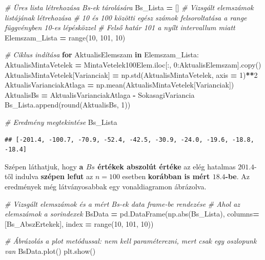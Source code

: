 \documentclass[
]{book}
\newenvironment{Shaded}{\begin{snugshade}}{\end{snugshade}}
\newcommand{\BuiltInTok}[1]{#1}
\newcommand{\CommentTok}[1]{\textcolor[rgb]{0.56,0.35,0.01}{\textit{#1}}}
\newcommand{\ControlFlowTok}[1]{\textcolor[rgb]{0.13,0.29,0.53}{\textbf{#1}}}
\newcommand{\DecValTok}[1]{\textcolor[rgb]{0.00,0.00,0.81}{#1}}
\newcommand{\KeywordTok}[1]{\textcolor[rgb]{0.13,0.29,0.53}{\textbf{#1}}}
\newcommand{\NormalTok}[1]{#1}
\newcommand{\OperatorTok}[1]{\textcolor[rgb]{0.81,0.36,0.00}{\textbf{#1}}}
\newcommand{\StringTok}[1]{\textcolor[rgb]{0.31,0.60,0.02}{#1}}
\begin{document}
\begin{Shaded}
\begin{Highlighting}[]
\CommentTok{\# Üres lista létrehozása Bs{-}ek tárolására}
\NormalTok{Bs\_Lista }\OperatorTok{=}\NormalTok{ []}
\CommentTok{\# Vizsgált elemszámok listájának létrehozása}
\CommentTok{\# 10 és 100 közötti egész számok felsoroltatása a \textquotesingle{}range\textquotesingle{} függvényben 10{-}es lépésközzel}
\CommentTok{\# Felső határ 101 a nyílt intervallum miatt}
\NormalTok{Elemszam\_Lista }\OperatorTok{=} \BuiltInTok{range}\NormalTok{(}\DecValTok{10}\NormalTok{, }\DecValTok{101}\NormalTok{, }\DecValTok{10}\NormalTok{)}

\CommentTok{\# Ciklus indítása}
\ControlFlowTok{for}\NormalTok{ AktualisElemszam }\KeywordTok{in}\NormalTok{ Elemszam\_Lista:}
\NormalTok{  AktualisMintaVetelek }\OperatorTok{=}\NormalTok{ MintaVetelek100Elem.iloc[:, }\DecValTok{0}\NormalTok{:AktualisElemszam].copy()}
\NormalTok{  AktualisMintaVetelek[}\StringTok{\textquotesingle{}Varianciak\textquotesingle{}}\NormalTok{] }\OperatorTok{=}\NormalTok{ np.std(AktualisMintaVetelek, axis }\OperatorTok{=} \DecValTok{1}\NormalTok{)}\OperatorTok{**}\DecValTok{2}
\NormalTok{  AktualisVarianciakAtlaga }\OperatorTok{=}\NormalTok{ np.mean(AktualisMintaVetelek[}\StringTok{\textquotesingle{}Varianciak\textquotesingle{}}\NormalTok{])}
\NormalTok{  AktualisBs }\OperatorTok{=}\NormalTok{ AktualisVarianciakAtlaga }\OperatorTok{{-}}\NormalTok{ SokasagiVariancia}
\NormalTok{  Bs\_Lista.append(}\BuiltInTok{round}\NormalTok{(AktualisBs, }\DecValTok{1}\NormalTok{))}

\CommentTok{\# Eredmény megtekintése }
\NormalTok{Bs\_Lista}
\end{Highlighting}
\end{Shaded}

\begin{verbatim}
## [-201.4, -100.7, -70.9, -52.4, -42.5, -30.9, -24.0, -19.6, -18.8, -18.4]
\end{verbatim}

Szépen láthatjuk, hogy \textbf{a \(Bs\) értékek abszolút értéke} az elég hatalmas \(201.4\)-től indulva \textbf{szépen lefut} az \(n=100\) esetben \textbf{korábban is mért \(18.4\)-be}. Az eredmények még látványosabbak egy vonaldiagramon ábrázolva.

\begin{Shaded}
\begin{Highlighting}[]
\CommentTok{\# Vizsgált elemszámok és a mért Bs{-}ek data frame{-}be rendezése}
\CommentTok{\# Ahol az elemszámok a sorindexek}
\NormalTok{BsData }\OperatorTok{=}\NormalTok{ pd.DataFrame(np.}\BuiltInTok{abs}\NormalTok{(Bs\_Lista), columns}\OperatorTok{=}\NormalTok{[}\StringTok{\textquotesingle{}Bs\_AbszErtekek\textquotesingle{}}\NormalTok{], index }\OperatorTok{=} \BuiltInTok{range}\NormalTok{(}\DecValTok{10}\NormalTok{, }\DecValTok{101}\NormalTok{, }\DecValTok{10}\NormalTok{))}

\CommentTok{\# Ábrázolás a \textquotesingle{}plot\textquotesingle{} metódussal: nem kell paraméterezni, mert csak egy oszlopunk van}
\NormalTok{BsData.plot()}
\NormalTok{plt.show()}
\end{Highlighting}
\end{Shaded}
\end{document}
